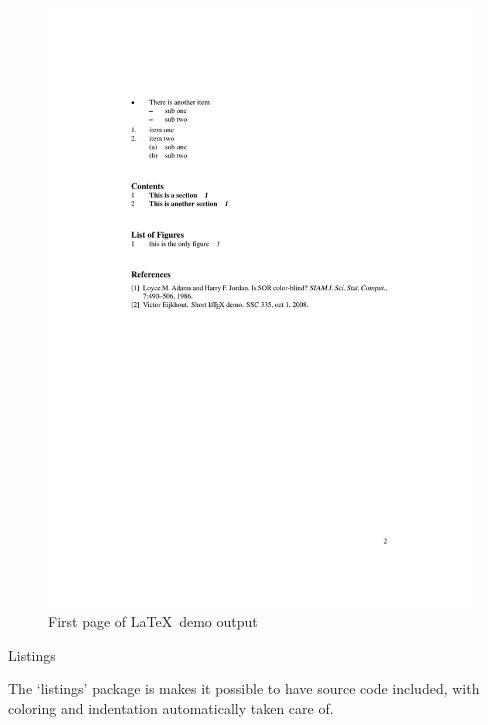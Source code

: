 \begin{figure}[p]
\includegraphics[scale=.75]{code/latexdemo/demopage2}
  \caption{First page of \LaTeX\ demo output}
  \label{fig:latex-page2}
\end{figure}

 {Listings}

The `listings' package is makes it possible to have source code included,
with coloring and indentation automatically taken care of.

\begin{multicols}{2}
\tiny
{}
\end{multicols}

